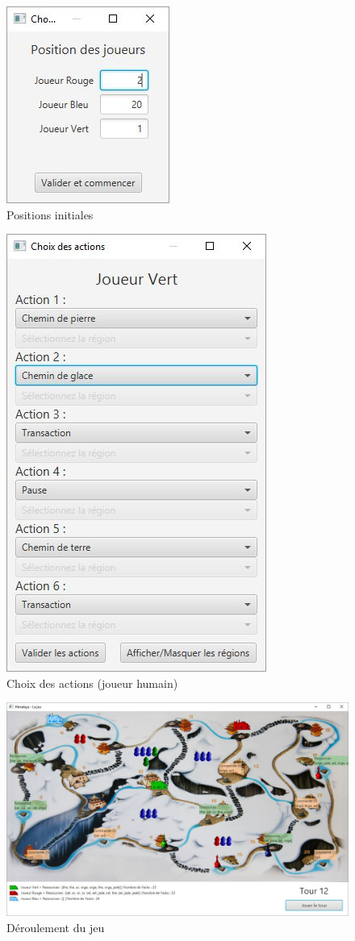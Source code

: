 \begin{figure}[h]
	\centering
	\includegraphics[width=0.4\linewidth]{images/position}
	\caption{Positions initiales}
	\label{fig:pos_init}
\end{figure}

\begin{figure}[h]
	\centering
	\includegraphics[width=0.4\linewidth]{images/actions}
	\caption{Choix des actions (joueur humain)}
	\label{fig:actions}
\end{figure}

\begin{figure}[h]
	\centering
	\includegraphics[width=0.9\linewidth]{images/etat_jeu_avance}
	\caption{Déroulement du jeu}
	\label{fig:etat_jeu}
\end{figure}

